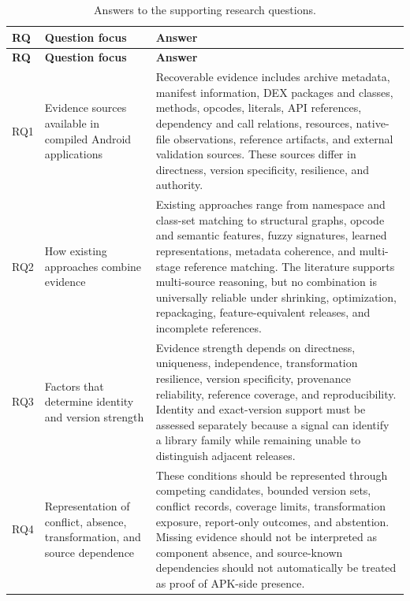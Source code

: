 \begingroup
\small
\setlength{\LTpre}{0.5em}
\setlength{\LTpost}{0.5em}
\begin{longtable}{>{\raggedright\arraybackslash}p{}>{\raggedright\arraybackslash}p{}>{\raggedright\arraybackslash}p{}}
\caption{Answers to the supporting research questions.}
\label{tab:master-rq-answers}\\
\toprule
\textbf{RQ} & \textbf{Question focus} & \textbf{Answer}\\
\midrule
\endfirsthead
\toprule
\textbf{RQ} & \textbf{Question focus} & \textbf{Answer}\\
\midrule
\endhead
RQ1 & Evidence sources available in compiled Android applications &
Recoverable evidence includes archive metadata, manifest information, DEX
packages and classes, methods, opcodes, literals, API references, dependency
and call relations, resources, native-file observations, reference artifacts,
and external validation sources. These sources differ in directness, version
specificity, resilience, and authority.\\

RQ2 & How existing approaches combine evidence & Existing approaches range
from namespace and class-set matching to structural graphs, opcode and
semantic features, fuzzy signatures, learned representations, metadata
coherence, and multi-stage reference matching. The literature supports
multi-source reasoning, but no combination is universally reliable under
shrinking, optimization, repackaging, feature-equivalent releases, and
incomplete references.\\

RQ3 & Factors that determine identity and version strength & Evidence strength
depends on directness, uniqueness, independence, transformation resilience,
version specificity, provenance reliability, reference coverage, and
reproducibility. Identity and exact-version support must be assessed
separately because a signal can identify a library family while remaining
unable to distinguish adjacent releases.\\

RQ4 & Representation of conflict, absence, transformation, and source
dependence & These conditions should be represented through competing
candidates, bounded version sets, conflict records, coverage limits,
transformation exposure, report-only outcomes, and abstention. Missing
evidence should not be interpreted as component absence, and source-known
dependencies should not automatically be treated as proof of APK-side
presence.\\


\end{longtable}
